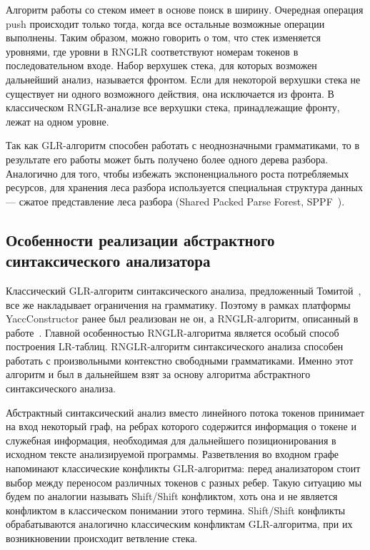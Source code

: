 Алгоритм работы со стеком имеет в основе поиск в ширину. Очередная операция push 
происходит только тогда, когда все остальные возможные операции выполнены. Таким 
образом, можно говорить о том, что стек изменяется уровнями, где уровни в RNGLR 
соответствуют номерам токенов в последовательном входе. Набор верхушек стека, для 
которых возможен дальнейший анализ, называется фронтом. Если для некоторой верхушки 
стека не существует ни одного возможного действия, она исключается из фронта. В 
классическом RNGLR-анализе все верхушки стека, принадлежащие фронту, лежат на одном 
уровне.

Так как GLR-алгоритм способен работать с неоднозначными грамматиками, то в результате 
его работы может быть получено более одного дерева разбора. Аналогично для того, 
чтобы избежать экспоненциального роста потребляемых ресурсов, для хранения леса 
разбора используется специальная структура данных — сжатое представление леса разбора 
(Shared Packed Parse Forest, SPPF~\cite{rekers1992parser}). 

\subsection{Особенности реализации абстрактного синтаксического анализатора}
Классический GLR-алгоритм синтаксического анализа, предложенный Томитой~\cite{Tomita:1984:LPN:980431.980564, Tomita:1985:ECP:1623611.1623625, Tomita:1985:EPN:537456}, 
все же накладывает ограничения на грамматику. Поэтому в рамках платформы YaccConstructor 
ранее был реализован не он, а RNGLR-алгоритм, описанный в работе~\cite{Scott:2006:RNG:1146809.1146810}. Главной 
особенностью RNGLR-алгоритма является особый способ построения LR-таблиц. 
RNGLR-алгоритм синтаксического анализа способен работать с произвольными контекстно 
свободными грамматиками. Именно этот алгоритм и был в дальнейшем взят за основу 
алгоритма абстрактного синтаксического анализа. 

Абстрактный синтаксический анализ вместо линейного потока токенов принимает на 
вход некоторый граф, на ребрах которого содержится информация о токене и служебная 
информация, необходимая для дальнейшего позиционирования в исходном тексте 
анализируемой программы. Разветвления во входном графе напоминают классические 
конфликты GLR-алгоритма: перед анализатором стоит выбор между переносом различных 
токенов с разных ребер. Такую ситуацию мы будем по аналогии называть Shift/Shift 
конфликтом, хоть она и не является конфликтом в классическом понимании этого термина. 
Shift/Shift конфликты обрабатываются аналогично классическим конфликтам GLR-алгоритма, 
при их возникновении происходит ветвление стека.

